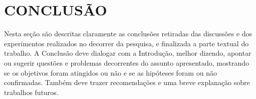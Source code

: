 \chapter*{CONCLUSÃO} 
\thispagestyle{plain}

Nesta seção são descritas claramente as conclusões retiradas das
discussões e dos experimentos realizados no decorrer da pesquisa, e finalizada a parte textual do trabalho. A Conclusão deve dialogar com a Introdução, melhor dizendo, apontar ou sugerir questões e problemas decorrentes do assunto apresentado, mostrando se os objetivos foram atingidos ou não e se as hipóteses foram ou não confirmadas. Também deve trazer recomendações e uma breve explanação sobre trabalhos futuros.

%
%
%
%
%
%
%
%
%
%
%
